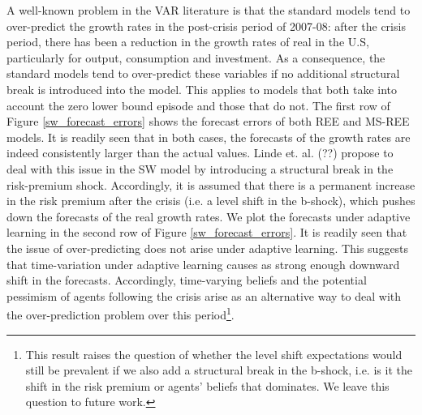 \documentclass[12pt,reqno]{article}
\numberwithin{equation}{section}
\begin{document}
\noindent
A well-known problem in the VAR literature is that the standard models tend to over-predict the growth rates in the post-crisis period of 2007-08: after the crisis period, there has been a reduction in the growth rates of real in the U.S, particularly for output, consumption and investment. As a consequence, the standard models tend to over-predict these variables if no additional structural break is introduced into the model. This applies to models that both take into account the zero lower bound episode and those that do not. The first row of Figure \ref{sw_forecast_errors} shows the forecast errors of both REE and MS-REE models. It is readily seen that in both cases, the forecasts of the growth rates are indeed consistently larger than the actual values. Linde et. al. (??) propose to deal with this issue in the SW model by introducing a structural break in the risk-premium shock. Accordingly, it is assumed that there is a permanent increase in the risk premium after the crisis (i.e. a level shift in the b-shock), which pushes down the forecasts of the real growth rates. We plot the forecasts under adaptive learning in the second row of Figure \ref{sw_forecast_errors}. It is readily seen that the issue of over-predicting does not arise under adaptive learning. This suggests that time-variation under adaptive learning causes as strong enough downward shift in the forecasts. Accordingly, time-varying beliefs and the potential pessimism of agents following the crisis arise as an alternative way to deal with the over-prediction problem over this period\footnote{This result raises the question of whether the level shift expectations would still be prevalent if we also add a structural break in the b-shock, i.e. is it the shift in the risk premium or agents' beliefs that dominates. We leave this question to future work.}. \\
\end{document}
